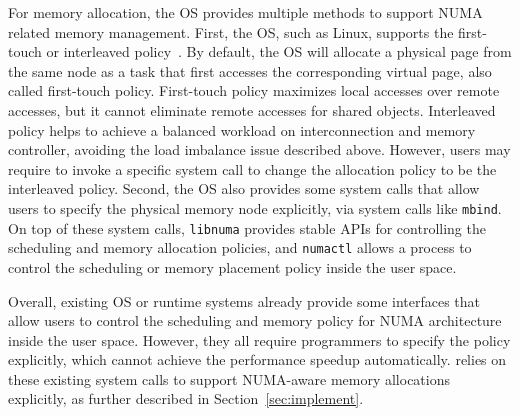 For memory allocation, the OS provides multiple methods to support NUMA related memory management. First, the OS, such as Linux, supports the first-touch or interleaved policy~\cite{lameter2013numa, diener2015locality}. By default, the OS will allocate a physical page from the same node as a task that first accesses the corresponding virtual page, also called  first-touch policy. First-touch policy maximizes local accesses over remote accesses, but it cannot eliminate remote accesses for shared objects. Interleaved policy helps to achieve a balanced workload  on interconnection and memory controller, avoiding the load imbalance issue described above. However, users may require to invoke a specific system call to change the allocation policy to be the interleaved policy. Second, the OS also provides some system calls that allow users to specify the physical memory node explicitly, via system calls like \texttt{mbind}. On top of these system calls, \texttt{libnuma} provides stable APIs for controlling the scheduling and memory allocation policies, and \texttt{numactl} allows a process to control the scheduling or memory placement policy inside the user space. 

Overall, existing OS or runtime systems already provide some interfaces that allow users to control the scheduling and memory policy for NUMA architecture inside the user space. However, they all require programmers to specify the policy explicitly, which cannot achieve the performance speedup automatically. \NM{} relies on these existing system calls to support NUMA-aware memory allocations explicitly, as further described in Section~\ref{sec:implement}. 







 
